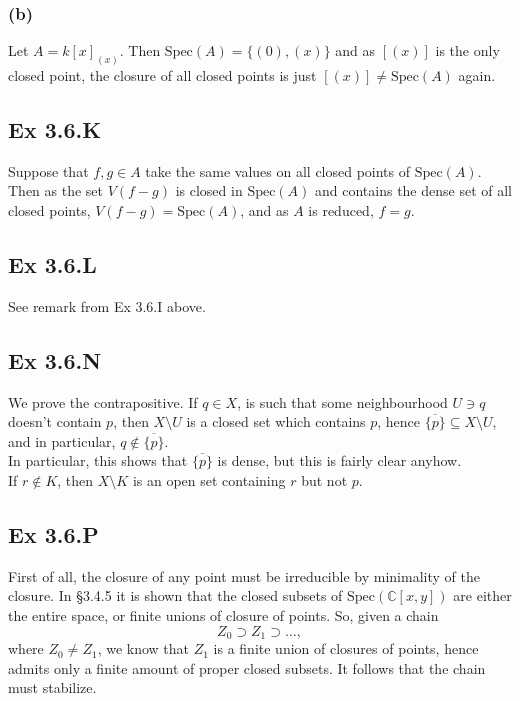 \documentclass{article}
\theoremstyle{definition}
\newcommand{\C}{\mathbb{C}}
\newcommand{\Spec}{\text{Spec}}
\begin{document}
\subsubsection*{(b)}

Let $A = k[x]_{(x)}$. Then $\Spec(A) = \{(0), (x)\}$ and as $[(x)]$ is the only
closed point, the closure of all closed points is just $[(x)] \not = \Spec(A)$
again.

\subsection*{Ex 3.6.K}

Suppose that $f, g \in A$ take the same values on all closed points of
$\Spec(A)$. Then as the set $V(f - g)$ is closed in $\Spec(A)$ and contains the
dense set of all closed points, $V(f - g) = \Spec(A)$, and as $A$ is reduced,
$f = g$.

\subsection*{Ex 3.6.L}

See remark from Ex 3.6.I above.

\subsection*{Ex 3.6.N}

We prove the contrapositive. If $q \in X$, is such that some neighbourhood $U
\ni q$ doesn't contain $p$, then $X \setminus U$ is a closed set which contains
$p$, hence $\overline{\{p\}} \subseteq X \setminus U$, and in particular, $q
\not \in \overline{\{p\}}$. \\

In particular, this shows that $\overline{\{p\}}$ is dense, but this is fairly
clear anyhow. \\

If $r \not \in K$, then $X \setminus K$ is an open set containing $r$ but not
$p$. 

\subsection*{Ex 3.6.P}

First of all, the closure of any point must be irreducible by minimality of the
closure. In §3.4.5 it is shown that the closed subsets of $\Spec(\C[x, y])$ are
either the entire space, or finite unions of closure of points. So, given a chain 
\[
	Z_0 \supset Z_1 \supset \ldots,
\] 
where $Z_0 \not = Z_1$, we know that $Z_1$ is a finite union of closures of
points, hence admits only a finite amount of proper closed subsets. It follows
that the chain must stabilize.
\end{document}
